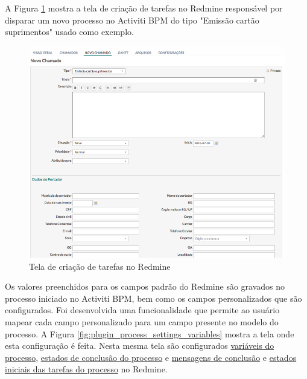 A Figura \ref{fig:new_issue} mostra a tela de criação de tarefas no Redmine responsável por disparar um novo processo no Activiti BPM do tipo "Emissão cartão suprimentos" usado como exemplo.

\begin{figure}[H]
\centering
\includegraphics[width=1\textwidth]{imagens/redmine_new_issue.png}
\caption{Tela de criação de tarefas no Redmine}
\label{fig:new_issue}
\end{figure}

Os valores preenchidos para os campos padrão do Redmine são gravados no processo iniciado no Activiti BPM, bem como os campos personalizados que são configurados. Foi desenvolvida uma funcionalidade que permite ao usuário mapear cada campo personalizado para um campo presente no modelo do processo. A Figura \ref{fig:plugin_process_settings_variables} mostra a tela onde esta configuração é feita. Nesta mesma tela são configurados \underline{variáveis do processo},  \underline{estados de conclusão do processo} e \underline{mensagens de conclusão} e \underline{estados iniciais das tarefas do processo} no Redmine. 

